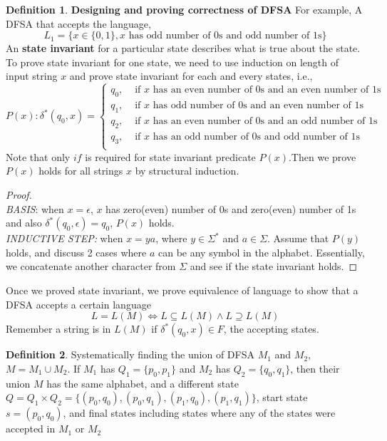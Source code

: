 \documentclass[11pt]{article}
\theoremstyle{plain}%
\theoremstyle{definition}
\newtheorem{defn}{Definition}
\theoremstyle{remark}
\begin{document}
\begin{defn}
  \textbf{Designing and proving correctness of DFSA}
  For example, A DFSA that accepts the language,
  \[
    L_1 = \{ x\in\{ 0, 1 \}, x \text{ has odd number of 0s and odd number of 1s}\}
  \]
  An \textbf{state invariant} for a particular state describes what is true about the state. To prove state invariant for one state, we need to use induction on length of input string $x$ and prove state invariant for each and every states, i.e.,
  \[
    P(x): \delta^*(q_0, x) =
    \begin{cases}
      q_0, & \text{ if $x$ has an even number of 0s and an even number of 1s}\\
      q_1, & \text{ if $x$ has odd number of 0s and an even number of 1s}\\
      q_2, & \text{ if $x$ has an even number of 0s and an odd number of 1s}\\
      q_3, & \text{ if $x$ has an odd number of 0s and odd number of 1s}\\
    \end{cases}
  \]
  Note that only $if$ is required for state invariant predicate $P(x)$.Then we prove $P(x)$ holds for all strings $x$ by structural induction.
  \begin{proof}
    $ $\\
    \textit{BASIS}: when $x=\epsilon$, $x$ has zero(even) number of 0s and zero(even) number of 1s and also $\delta^*(q_0, \epsilon) = q_0$, $P(x)$ holds.\\
    \textit{INDUCTIVE STEP:} when $x=ya$, where $y\in\Sigma^*$ and $a\in\Sigma$. Assume that $P(y)$ holds, and discuss 2 cases where $a$ can be any symbol in the alphabet. Essentially, we concatenate another character from $\Sigma$ and see if the state invariant holds.
  \end{proof}

  Once we proved state invariant, we prove equivalence of language to show that a DFSA accepts a certain language
  \[
    L = L(M) \iff L\subseteq L(M) \land L\supseteq L(M)
  \]
  Remember a string is in $L(M)$ if $\delta^*(q_0, x) \in F$, the accepting states.
\end{defn}


\begin{defn}
  Systematically finding the union of DFSA $M_1$ and $M_2$, $M=M_1\cup M_2$. If $M_1$ has $Q_1=\{ p_0, p_1\}$ and $M_2$ has $Q_2=\{ q_0, q_1\}$, then their union $M$ has the same alphabet, and a different state $Q = Q_1 \times Q_2 = \{ (p_0, q_0), (p_0, q_1), (p_1, q_0), (p_1, q_1)\}$, start state $s=(p_0, q_0)$, and final states including states where any of the states were accepted in $M_1$ or $M_2$
\end{defn}
\end{document}
